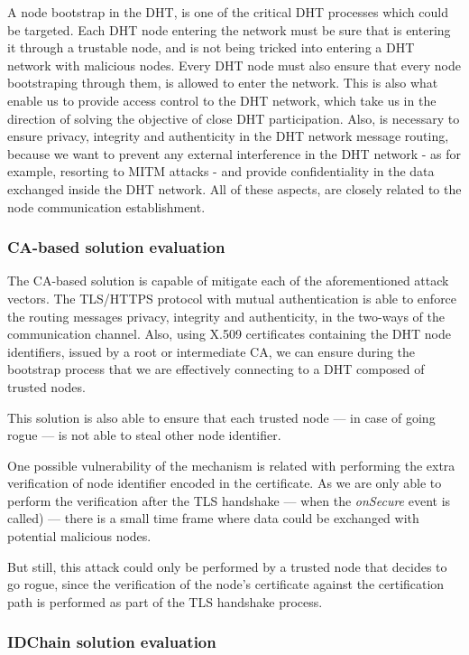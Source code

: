 A node bootstrap in the DHT, is one of the critical DHT processes which could be targeted.
Each DHT node entering the network must be sure that is entering it through a trustable node, and is not being tricked into entering a DHT network with malicious nodes.
Every DHT node must also ensure that every node bootstraping through them, is allowed to enter the network.
This is also what enable us to provide access control to the DHT network, which take us in the direction of solving the objective of close DHT participation.
Also, is necessary to ensure privacy, integrity and authenticity in the DHT network message routing, because we want to prevent any external interference in the DHT network - as for example, resorting to MITM attacks - and provide confidentiality in the data exchanged inside the DHT network.
All of these aspects, are closely related to the node communication establishment.

\subsubsection{CA-based solution evaluation}

The CA-based solution is capable of mitigate each of the aforementioned attack vectors.
The TLS/HTTPS protocol with mutual authentication is able to enforce the routing messages privacy, integrity and authenticity, in the two-ways of the communication channel.
Also, using X.509 certificates containing the DHT node identifiers, issued by a root or intermediate CA, we can ensure during the bootstrap process that we are effectively connecting to a DHT composed of trusted nodes.

This solution is also able to ensure that each trusted node — in case of going rogue — is not able to steal other node identifier.

One possible vulnerability of the mechanism is related with performing the extra verification of node identifier encoded in the certificate.
As we are only able to perform the verification after the TLS handshake — when the \textit{onSecure} event is called) — there is a small time frame where data could be exchanged with potential malicious nodes.

But still, this attack could only be performed by a trusted node that decides to go rogue, since the verification of the node's certificate against the certification path is performed as part of the TLS handshake process.

\subsubsection{IDChain solution evaluation}

